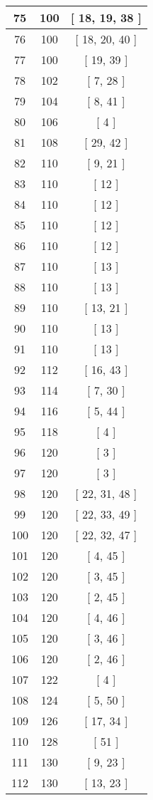 \begin{center}
\begin{longtable}[H]{|| c c c ||}
75 & 100 & [ 18, 19, 38 ]
\\\hline
76 & 100 & [ 18, 20, 40 ]
\\\hline
77 & 100 & [ 19, 39 ]
\\\hline
78 & 102 & [ 7, 28 ]
\\\hline
79 & 104 & [ 8, 41 ]
\\\hline
80 & 106 & [ 4 ]
\\\hline
81 & 108 & [ 29, 42 ]
\\\hline
82 & 110 & [ 9, 21 ]
\\\hline
83 & 110 & [ 12 ]
\\\hline
84 & 110 & [ 12 ]
\\\hline
85 & 110 & [ 12 ]
\\\hline
86 & 110 & [ 12 ]
\\\hline
87 & 110 & [ 13 ]
\\\hline
88 & 110 & [ 13 ]
\\\hline
89 & 110 & [ 13, 21 ]
\\\hline
90 & 110 & [ 13 ]
\\\hline
91 & 110 & [ 13 ]
\\\hline
92 & 112 & [ 16, 43 ]
\\\hline
93 & 114 & [ 7, 30 ]
\\\hline
94 & 116 & [ 5, 44 ]
\\\hline
95 & 118 & [ 4 ]
\\\hline
96 & 120 & [ 3 ]
\\\hline
97 & 120 & [ 3 ]
\\\hline
98 & 120 & [ 22, 31, 48 ]
\\\hline
99 & 120 & [ 22, 33, 49 ]
\\\hline
100 & 120 & [ 22, 32, 47 ]
\\\hline
101 & 120 & [ 4, 45 ]
\\\hline
102 & 120 & [ 3, 45 ]
\\\hline
103 & 120 & [ 2, 45 ]
\\\hline
104 & 120 & [ 4, 46 ]
\\\hline
105 & 120 & [ 3, 46 ]
\\\hline
106 & 120 & [ 2, 46 ]
\\\hline
107 & 122 & [ 4 ]
\\\hline
108 & 124 & [ 5, 50 ]
\\\hline
109 & 126 & [ 17, 34 ]
\\\hline
110 & 128 & [ 51 ]
\\\hline
111 & 130 & [ 9, 23 ]
\\\hline
112 & 130 & [ 13, 23 ]

\end{longtable}
\end{center}
